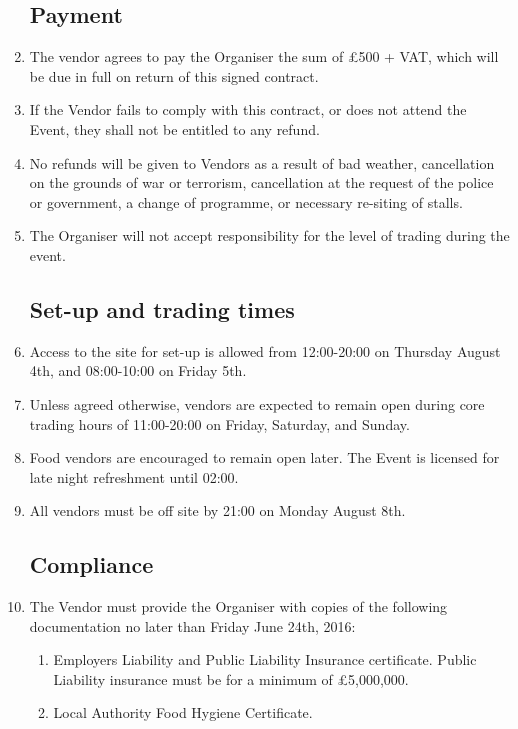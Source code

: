 \begin{enumerate}

\subsection*{Payment}
\item The vendor agrees to pay the Organiser the sum of £500 + VAT, which will be due in
      full on return of this signed contract.
\item If the Vendor fails to comply with this contract, or does not attend the Event,
        they shall not be entitled to any refund.
\item No refunds will be given to Vendors as a result of bad weather, cancellation on the
        grounds of war or terrorism, cancellation at the request of the police or government,
        a change of programme, or necessary re-siting of stalls.
\item The Organiser will not accept responsibility for the level of trading during the event.

\subsection*{Set-up and trading times}
\item Access to the site for set-up is allowed from 12:00-20:00 on Thursday August 4th, and
        08:00-10:00 on Friday 5th.
\item Unless agreed otherwise, vendors are expected to remain open during core trading
        hours of 11:00-20:00 on Friday, Saturday, and Sunday.
\item Food vendors are encouraged to remain open later. The Event is licensed for late
        night refreshment until 02:00.
\item All vendors must be off site by 21:00 on Monday August 8th.

\subsection*{Compliance}
\item The Vendor must provide the Organiser with copies of the following documentation no later
        than Friday June 24th, 2016:
\begin{enumerate}
    \item Employers Liability and Public Liability Insurance certificate.
            Public Liability insurance must be for a minimum of £5,000,000.
    \item Local Authority Food Hygiene Certificate.
\end{enumerate}


\end{enumerate}
